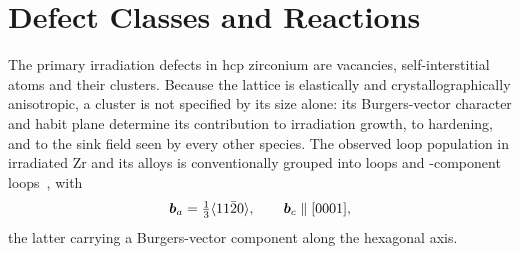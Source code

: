 \section{Defect Classes and Reactions}\label{sec:classes}

The primary irradiation defects in hcp zirconium are vacancies, self-interstitial
atoms and their clusters. Because the lattice is elastically and
crystallographically anisotropic, a cluster is not specified by its size alone:
its Burgers-vector character and habit plane determine its contribution to
irradiation growth, to hardening, and to the sink field seen by every other
species. The observed loop population in irradiated Zr and its alloys is
conventionally grouped into \aloop{} loops and \cloop{}-component
loops~\citep{kelly1973characterization,ChoiKim2013,tournadre2012experimental},
with
\begin{equation}
  \bm{b}_a=\tfrac13\langle11\bar20\rangle,
  \qquad
  \bm{b}_c \parallel [0001],
  \label{eq:burgers-general}
\end{equation}
the latter carrying a Burgers-vector component along the hexagonal axis.

